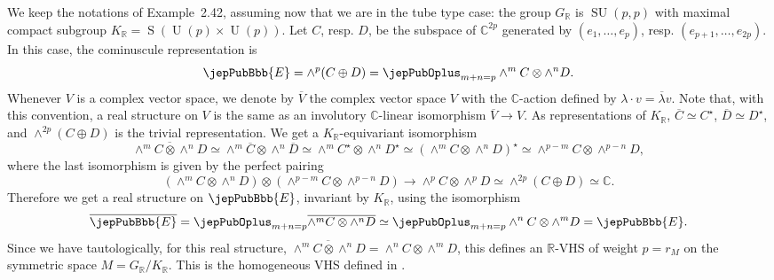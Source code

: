 \begin{example}
We keep the notations of Example~2.42, assuming now that we are in the tube type case: the group $G_{\mathbb R}$ is $\operatorname{SU}(p,p)$ with maximal compact subgroup $K_{\mathbb R}=\operatorname S(\operatorname U(p)\times\operatorname U(p))$. Let $C$, resp. $D$, be the subspace of $\mathbb C^{2p}$ generated by $(e_1,\ldots,e_p)$, resp. $(e_{p+1},\ldots,e_{2p})$. In this case, the cominuscule representation is
\[
\jepPubBbb{E}=\wedge^p(C\oplus D)=\jepPubOplus_{m+n=p}\wedge^m C\otimes\wedge^n D.
\]
Whenever $V$ is a complex vector space, we denote by $\overline V$ the complex vector space $V$ with the $\mathbb C$-action defined by $\lambda\cdot v=\overline\lambda v$. Note that, with this convention, a real structure on $V$ is the same as an involutory $\mathbb C$-linear isomorphism $\overline V\to V$. As representations of $K_{\mathbb R}$, $\overline C\simeq C^\star$, $\overline D\simeq D^\star$, and $\wedge^{2p}(C\oplus D)$ is the trivial representation. We get a $K_{\mathbb R}$-equivariant isomorphism
\[
\overline{\wedge^m C\otimes\wedge^n D}\simeq\wedge^m\overline C\otimes\wedge^n\overline D\simeq\wedge^m C^\star\otimes\wedge^n D^\star\simeq(\wedge^m C\otimes\wedge^n D)^\star\simeq\wedge^{p-m}C\otimes\wedge^{p-n}D,
\]
where the last isomorphism is given by the perfect pairing
\[
(\wedge^m C\otimes\wedge^n D)\otimes(\wedge^{p-m}C\otimes\wedge^{p-n}D)\longrightarrow\wedge^p C\otimes\wedge^p D\simeq\wedge^{2p}(C\oplus D)\simeq\mathbb C.
\]
Therefore we get a real structure on $\jepPubBbb{E}$, invariant by $K_{\mathbb R}$, using the isomorphism
\[
\overline{\jepPubBbb{E}}=\jepPubOplus_{m+n=p}\overline{\wedge^m C\otimes\wedge^n D}\simeq\jepPubOplus_{m+n=p}\wedge^n C\otimes\wedge^m D=\jepPubBbb{E}.
\]
Since we have tautologically, for this real structure, $\overline{\wedge^m C\otimes\wedge^n D}=\wedge^n C\otimes\wedge^m D$, this defines an $\mathbb R$-VHS of weight $p=r_M$ on the symmetric space $M=G_{\mathbb R}/K_{\mathbb R}$. This is the homogeneous VHS defined in \cite{jep93Gro94}.


\end{example}
